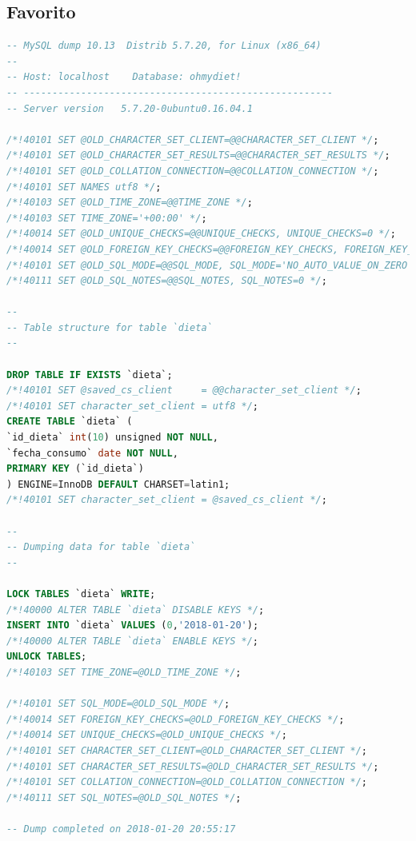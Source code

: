 \documentclass[12pt,letterpaper]{article}
\begin{document}
\subsection{Favorito}
\begin{lstlisting}[language=sql]
-- MySQL dump 10.13  Distrib 5.7.20, for Linux (x86_64)
--
-- Host: localhost    Database: ohmydiet!
-- ------------------------------------------------------
-- Server version	5.7.20-0ubuntu0.16.04.1

/*!40101 SET @OLD_CHARACTER_SET_CLIENT=@@CHARACTER_SET_CLIENT */;
/*!40101 SET @OLD_CHARACTER_SET_RESULTS=@@CHARACTER_SET_RESULTS */;
/*!40101 SET @OLD_COLLATION_CONNECTION=@@COLLATION_CONNECTION */;
/*!40101 SET NAMES utf8 */;
/*!40103 SET @OLD_TIME_ZONE=@@TIME_ZONE */;
/*!40103 SET TIME_ZONE='+00:00' */;
/*!40014 SET @OLD_UNIQUE_CHECKS=@@UNIQUE_CHECKS, UNIQUE_CHECKS=0 */;
/*!40014 SET @OLD_FOREIGN_KEY_CHECKS=@@FOREIGN_KEY_CHECKS, FOREIGN_KEY_CHECKS=0 */;
/*!40101 SET @OLD_SQL_MODE=@@SQL_MODE, SQL_MODE='NO_AUTO_VALUE_ON_ZERO' */;
/*!40111 SET @OLD_SQL_NOTES=@@SQL_NOTES, SQL_NOTES=0 */;

--
-- Table structure for table `dieta`
--

DROP TABLE IF EXISTS `dieta`;
/*!40101 SET @saved_cs_client     = @@character_set_client */;
/*!40101 SET character_set_client = utf8 */;
CREATE TABLE `dieta` (
`id_dieta` int(10) unsigned NOT NULL,
`fecha_consumo` date NOT NULL,
PRIMARY KEY (`id_dieta`)
) ENGINE=InnoDB DEFAULT CHARSET=latin1;
/*!40101 SET character_set_client = @saved_cs_client */;

--
-- Dumping data for table `dieta`
--

LOCK TABLES `dieta` WRITE;
/*!40000 ALTER TABLE `dieta` DISABLE KEYS */;
INSERT INTO `dieta` VALUES (0,'2018-01-20');
/*!40000 ALTER TABLE `dieta` ENABLE KEYS */;
UNLOCK TABLES;
/*!40103 SET TIME_ZONE=@OLD_TIME_ZONE */;

/*!40101 SET SQL_MODE=@OLD_SQL_MODE */;
/*!40014 SET FOREIGN_KEY_CHECKS=@OLD_FOREIGN_KEY_CHECKS */;
/*!40014 SET UNIQUE_CHECKS=@OLD_UNIQUE_CHECKS */;
/*!40101 SET CHARACTER_SET_CLIENT=@OLD_CHARACTER_SET_CLIENT */;
/*!40101 SET CHARACTER_SET_RESULTS=@OLD_CHARACTER_SET_RESULTS */;
/*!40101 SET COLLATION_CONNECTION=@OLD_COLLATION_CONNECTION */;
/*!40111 SET SQL_NOTES=@OLD_SQL_NOTES */;

-- Dump completed on 2018-01-20 20:55:17

\end{lstlisting}
\end{document}
